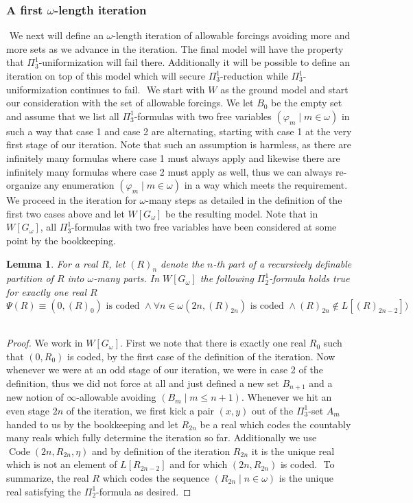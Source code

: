 \documentclass[a4paper,11pt]{article}
\newtheorem{lemma}[theorem]{Lemma}
\begin{document}
    \subsubsection{A first \texorpdfstring{$\omega$}{omega}-length iteration}
    ﻿
    We next will define an $\omega$-length iteration of allowable forcings avoiding more and more sets as we advance in the iteration.
    The final model will have the property that $\Pi^1_3$-uniformization will fail there. Additionally it will be possible to define an iteration on top of this model which will secure $\Pi^1_3$-reduction while $\Pi^1_3$-uniformization continues to fail.
    ﻿
    We start with $W$ as the ground model and start our consideration with the set of allowable forcings. We let $B_0$ be the empty set and assume that we list all $\Pi^1_3$-formulas with two free variables $(\varphi_m \mid m \in \omega)$ in such a way that case 1 and case 2 are alternating, starting with case 1 at the very first stage of our iteration.  Note that such an assumption is harmless, as there are infinitely many formulas where case 1 must always apply and likewise there are infinitely many formulas where case 2 must apply as well, thus we can always re-organize any enumeration $(\varphi_m \mid m \in \omega)$ in a way which meets the requirement.
    ﻿
    We proceed in the iteration for $\omega$-many steps as detailed in the definition of the first two cases above and let $W[G_{\omega}]$ be the resulting model. Note that in $W[G_{\omega}]$, all $\Pi^1_3$-formulas with two free variables have been considered at some point by the bookkeeping.
    \begin{lemma}
    For a real $R$, let  $(R)_n$ denote the $n$-th part of a recursively definable partition of $R$ into $\omega$-many parts. In $W[G_{\omega}]$ the following $\Pi^1_2$-formula holds true for exactly one real $R$
    \[\Psi (R) \equiv  (0, (R)_0) \text{ is coded } \land \forall n \in \omega ( 2n, (R)_{2n} ) \text{ is coded } \land (R)_{2n} \notin L[(R)_{2n-2}] ) \] 
    ﻿
    \end{lemma}\label{DefinabilityR}
    \begin{proof}
    We work in $W[G_{\omega}]$. First we note that there is exactly one real $R_0$ such that $(0,R_0)$ is coded, by the first case of the definition of the iteration. 
    Now whenever we were at an odd stage of our iteration, we were in case 2 of the definition, thus we did not force at all and just defined a new set $B_{n+1}$ and a new notion of $\infty$-allowable avoiding $(B_{m} \mid m \le n+1)$.
    Whenever we hit an even stage $2n$ of the iteration, we first kick a pair $(x,y)$ out of the $\Pi^1_3$-set $A_m$ handed to us by the bookkeeping and let $R_{2n}$ be a real which codes the countably many reals which fully determine the iteration so far.  Additionally we use $\operatorname{Code} (2n, R_{2n}, \eta)$ and by definition of the iteration $R_{2n}$ it is the unique real which is not an element of $L[R_{2n-2}]$ and for which $(2n, R_{2n})$ is coded.
    ﻿
    To summarize, the real $R$ which codes the sequence $(R_{2n} \mid n \in \omega)$ is the unique real satisfying the $\Pi^1_2$-formula as desired.
    \end{proof}
    ﻿
\end{document}
